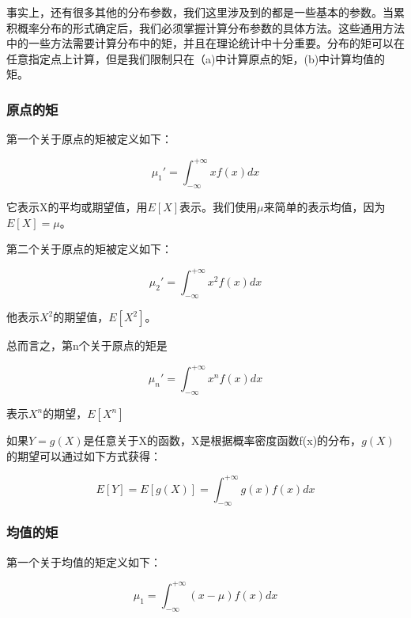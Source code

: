 \documentclass[cn,11pt,chinese]{elegantbook}
\begin{document}
{事实上，还有很多其他的分布参数，我们这里涉及到的都是一些基本的参数。当累积概率分布的形式确定后，我们必须掌握计算分布参数的具体方法。这些通用方法中的一些方法需要计算分布中的矩，并且在理论统计中十分重要。分布的矩可以在任意指定点上计算，但是我们限制只在（a)中计算原点的矩，(b)中计算均值的矩。

\subsubsection{原点的矩}

第一个关于原点的矩被定义如下：

\begin{equation}\label{eq10-14}
\mu _1 ' = \int_{-\infty}^{+\infty}xf(x)dx 
\end{equation}


它表示X的平均或期望值，用$E[X]$表示。我们使用$\mu$来简单的表示均值，因为$E[X]=\mu$。

第二个关于原点的矩被定义如下：

\begin{equation}\label{eq10-15}
\mu _2 '=\int_{-\infty}^{+\infty}x^2f(x)dx
\end{equation}



他表示$X^2$的期望值，$E[X^2]$。

总而言之，第n个关于原点的矩是

\begin{equation}\label{eq10-16}
\mu _n '=\int_{-\infty}^{+\infty}x^nf(x)dx 
\end{equation}


表示$X^n$的期望，$E[X^n]$

如果$Y=g(X)$是任意关于X的函数，X是根据概率密度函数f(x)的分布，$g(X)$的期望可以通过如下方式获得：

\begin{equation}\label{eq10-17}
E[Y]=E[g(X)]=\int_{-\infty}^{+\infty}g(x)f(x)dx 
\end{equation}


\subsubsection{均值的矩}

第一个关于均值的矩定义如下：

\begin{equation}\label{eq10-18}
\mu_1=\int_{-\infty}^{+\infty}(x-\mu)f(x)dx 
\end{equation}



}
\end{document}
